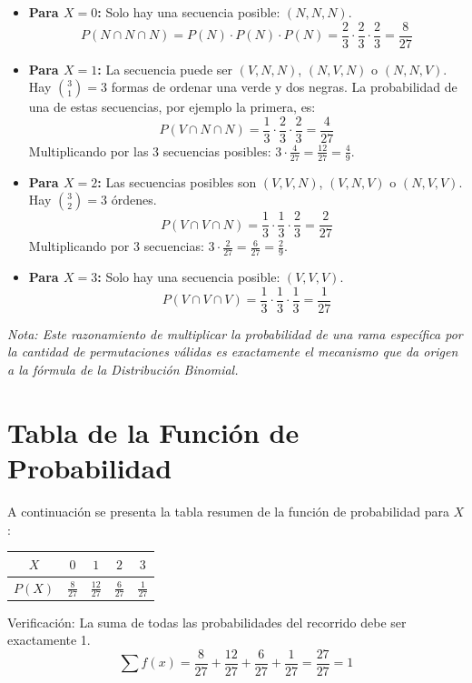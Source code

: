 \documentclass[a4paper,12pt]{article}
\begin{document}
\begin{itemize}
    \item \textbf{Para $X = 0$:} Solo hay una secuencia posible: $(N, N, N)$.
    $$P(N \cap N \cap N) = P(N) \cdot P(N) \cdot P(N) = \frac{2}{3} \cdot \frac{2}{3} \cdot \frac{2}{3} = \frac{8}{27}$$

    \item \textbf{Para $X = 1$:} La secuencia puede ser $(V, N, N)$, $(N, V, N)$ o $(N, N, V)$. Hay $\binom{3}{1} = 3$ formas de ordenar una verde y dos negras. La probabilidad de una de estas secuencias, por ejemplo la primera, es:
    $$P(V \cap N \cap N) = \frac{1}{3} \cdot \frac{2}{3} \cdot \frac{2}{3} = \frac{4}{27}$$
    Multiplicando por las 3 secuencias posibles: $3 \cdot \frac{4}{27} = \frac{12}{27} = \frac{4}{9}$.

    \item \textbf{Para $X = 2$:} Las secuencias posibles son $(V, V, N)$, $(V, N, V)$ o $(N, V, V)$. Hay $\binom{3}{2} = 3$ órdenes.
    $$P(V \cap V \cap N) = \frac{1}{3} \cdot \frac{1}{3} \cdot \frac{2}{3} = \frac{2}{27}$$
    Multiplicando por 3 secuencias: $3 \cdot \frac{2}{27} = \frac{6}{27} = \frac{2}{9}$.

    \item \textbf{Para $X = 3$:} Solo hay una secuencia posible: $(V, V, V)$.
    $$P(V \cap V \cap V) = \frac{1}{3} \cdot \frac{1}{3} \cdot \frac{1}{3} = \frac{1}{27}$$
\end{itemize}
\textit{Nota: Este razonamiento de multiplicar la probabilidad de una rama específica por la cantidad de permutaciones válidas es exactamente el mecanismo que da origen a la fórmula de la Distribución Binomial.}

\vspace{0.5cm}

\section*{Tabla de la Función de Probabilidad}
A continuación se presenta la tabla resumen de la función de probabilidad para $X$:

\begin{center}
\renewcommand{\arraystretch}{1.5}
\begin{tabular}{|c|c|c|c|c|}
\hline
\textbf{$X$} & $0$ & $1$ & $2$ & $3$ \\
\hline
\textbf{$P(X)$} & $\frac{8}{27}$ & $\frac{12}{27}$ & $\frac{6}{27}$ & $\frac{1}{27}$ \\
\hline
\end{tabular}
\end{center}

Verificación: La suma de todas las probabilidades del recorrido debe ser exactamente 1.
$$\sum f(x) = \frac{8}{27} + \frac{12}{27} + \frac{6}{27} + \frac{1}{27} = \frac{27}{27} = 1$$
\end{document}
